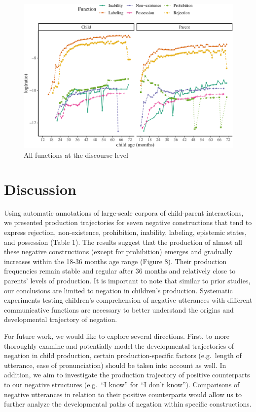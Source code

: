 \documentclass[
  english,
  man,floatsintext]{apa6}
\begin{document}
\begin{figure}[H]

{\centering \includegraphics{neg_construction_article_files/figure-latex/alldiscourse-1} 

}

\caption{All functions at the discourse level}\label{fig:alldiscourse}
\end{figure}

\hypertarget{discussion}{%
\section{Discussion}\label{discussion}}

Using automatic annotations of large-scale corpora of child-parent interactions, we presented production trajectories for seven negative constructions that tend to express rejection, non-existence, prohibition, inability, labeling, epistemic states, and possession (Table 1). The results suggest that the production of almost all these negative constructions (except for prohibition) emerges and gradually increases within the 18-36 months age range (Figure 8). Their production frequencies remain stable and regular after 36 months and relatively close to parents' levels of production. It is important to note that similar to prior studies, our conclusions are limited to negation in children's production. Systematic experiments testing children's comprehension of negative utterances with different communicative functions are necessary to better understand the origins and developmental trajectory of negation.

For future work, we would like to explore several directions. First, to more thoroughly examine and potentially model the developmental trajectories of negation in child production, certain production-specific factors (e.g.~length of utterance, ease of pronunciation) should be taken into account as well. In addition, we aim to investigate the production trajectory of positive counterparts to our negative structures (e.g.~``I know'' for ``I don't know''). Comparisons of negative utterances in relation to their positive counterparts would allow us to further analyze the developmental paths of negation within specific constructions.
\end{document}
